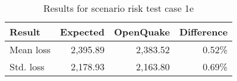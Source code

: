 \begin{table}[htbp]

\centering
\begin{tabular}{ l r r r }

\hline
\rowcolor{anti-flashwhite}
\bf{Result} & \bf{Expected} & \bf{OpenQuake} & \bf{Difference}\\
\hline
Mean loss & 2,395.89 & 2,383.52 & 0.52\% \\
Std. loss & 2,178.93 & 2,163.80 & 0.69\% \\
\hline
\end{tabular}

\caption{Results for scenario risk test case 1e}
\label{tab:result-scenario-risk-1e}
\end{table}